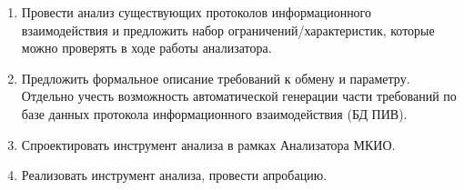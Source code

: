 \begin{enumerate}
 \item Провести анализ существующих протоколов информационного 
взаимодействия и предложить набор ограничений/характеристик, которые можно 
проверять в ходе работы анализатора.
 \item Предложить формальное описание требований к обмену и параметру. Отдельно 
учесть возможность автоматической генерации части требований по базе данных 
протокола информационного взаимодействия (БД ПИВ).
 \item Спроектировать инструмент анализа в рамках Анализатора МКИО.
 \item Реализовать инструмент анализа, провести апробацию.
\end{enumerate}

